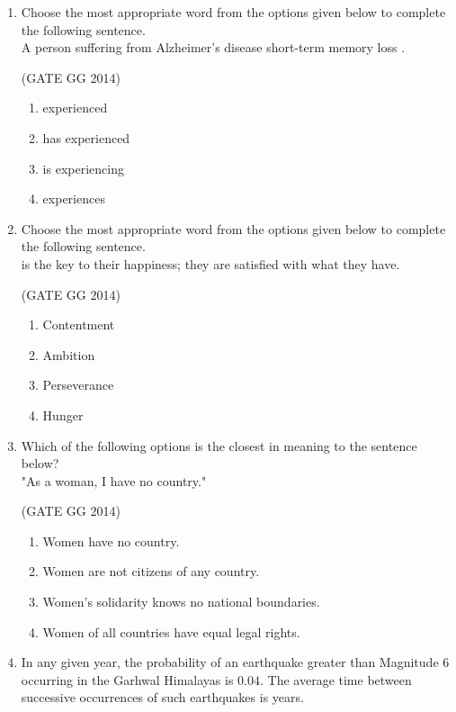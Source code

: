 \documentclass[journal]{IEEEtran}
\begin{document}
\begin{enumerate}[start=1]
\item Choose the most appropriate word from the options given  below to complete the following sentence.\\

A person suffering from  Alzheimer's disease \makebox[2cm]{\hrulefill} short-term  memory loss .

\hfill{(GATE GG 2014)}
\begin{enumerate}
    \item  experienced
\item  has experienced
\item  is experiencing
\item  experiences
\end{enumerate}
\vspace{0.5cm}
\item Choose the most appropriate word from the options given below to complete the following sentence.\\

\makebox[2cm]{\hrulefill}is the key to their happiness; they are satisfied with what they have.

\hfill{(GATE GG 2014)}
\begin{multicols}{4}
    \begin{enumerate}
    \item  Contentment
\item  Ambition
\item  Perseverance
\item  Hunger
\end{enumerate}
\end{multicols}

\vspace{0.5cm}
\item Which of the following options is the closest in meaning to the sentence below?\\

"As a woman, I have no country."

\hfill{(GATE GG 2014)}
\begin{enumerate}
    \item  Women have no country.
\item  Women are not citizens of any country.
\item  Women's solidarity knows no national boundaries.
\item  Women of all countries have equal legal rights.
\end{enumerate}
\vspace{0.5cm}
\item In any given year, the probability of an earthquake greater  than Magnitude $6$ occurring in the Garhwal Himalayas is $0.04$. The average time between successive occurrences of such earthquakes is \makebox[1cm]{\hrulefill} years.


\end{enumerate}
\end{document}

